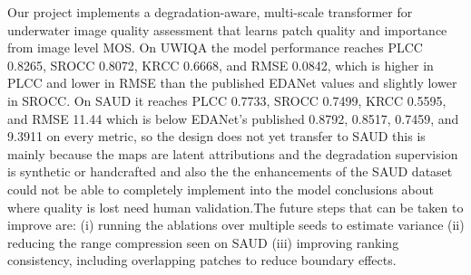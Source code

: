 \documentclass[conference]{IEEEtran}
\begin{document}
Our project implements a degradation-aware, multi-scale transformer for underwater image quality
assessment that learns patch quality and importance from image level MOS. On UWIQA the model
performance reaches PLCC 0.8265, SROCC 0.8072, KRCC 0.6668, and RMSE 0.0842, which is higher in
PLCC and lower in RMSE than the published EDANet values and slightly lower in SROCC. On SAUD it
reaches PLCC 0.7733, SROCC 0.7499, KRCC 0.5595, and RMSE 11.44 which is below EDANet’s
published 0.8792, 0.8517, 0.7459, and 9.3911 on every metric, so the design does not yet transfer to SAUD
this is mainly because the maps are latent attributions and the degradation supervision is synthetic or
handcrafted and also the the enhancements of the SAUD dataset could not be able to completely
implement into the model
conclusions about where quality is lost need human validation.The future steps that can be taken to
improve are:
(i) running the ablations over multiple seeds to estimate variance
(ii) reducing the range compression seen on SAUD
(iii) improving ranking consistency, including overlapping patches to reduce boundary effects.
\vspace{0.3cm}
\end{document}
